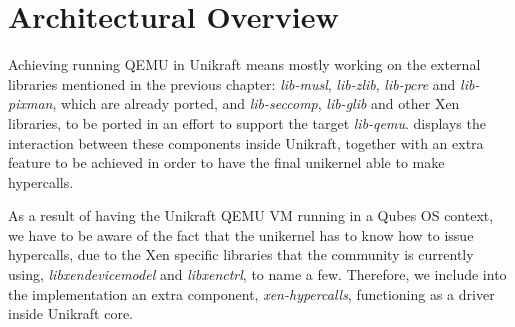 \chapter{Architectural Overview}
\label{chapter:architecture}

Achieving running QEMU in Unikraft means mostly working on the external libraries mentioned in the previous chapter: \textit{lib-musl}, \textit{lib-zlib}, \textit{lib-pcre} and \textit{lib-pixman}, which are already ported, and \textit{lib-seccomp}, \textit{lib-glib} and other Xen libraries, to be ported in an effort to support the target \textit{lib-qemu}.
 displays the interaction between these components inside Unikraft, together with an extra feature to be achieved in order to have the final unikernel able to make hypercalls.


As a result of having the Unikraft QEMU VM running in a Qubes OS context, we have to be aware of the fact that the unikernel has to know how to issue hypercalls, due to the Xen specific libraries that the community is currently using, \textit{libxendevicemodel} and \textit{libxenctrl}, to name a few.
Therefore, we include into the implementation an extra component, \textit{xen-hypercalls}, functioning as a driver inside Unikraft core.
